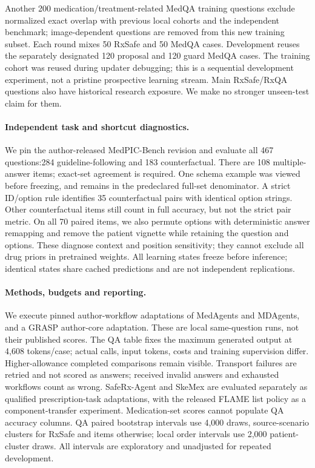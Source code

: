 Another 200 medication/treatment-related MedQA training questions exclude normalized exact overlap with previous local cohorts and the independent benchmark; image-dependent questions are removed from this new training subset. Each round mixes 50 RxSafe and 50 MedQA cases. Development reuses the separately designated 120 proposal and 120 guard MedQA cases. The training cohort was reused during updater debugging; this is a sequential development experiment, not a pristine prospective learning stream. Main RxSafe/RxQA questions also have historical research exposure. We make no stronger unseen-test claim for them.

\paragraph{Independent task and shortcut diagnostics.}
We pin the author-released MedPIC-Bench revision and evaluate all 467 questions:284 guideline-following and 183 counterfactual. There are 108 multiple-answer items; exact-set agreement is required. One schema example was viewed before freezing, and remains in the predeclared full-set denominator. A strict ID/option rule identifies 35 counterfactual pairs with identical option strings. Other counterfactual items still count in full accuracy, but not the strict pair metric. On all 70 paired items, we also permute options with deterministic answer remapping and remove the patient vignette while retaining the question and options. These diagnose context and position sensitivity; they cannot exclude all drug priors in pretrained weights. All learning states freeze before inference; identical states share cached predictions and are not independent replications.

\paragraph{Methods, budgets and reporting.}
We execute pinned author-workflow adaptations of MedAgents and MDAgents, and a GRASP author-core adaptation. These are local same-question runs, not their published scores. The QA table fixes the maximum generated output at 4,608 tokens/case; actual calls, input tokens, costs and training supervision differ. Higher-allowance completed comparisons remain visible. Transport failures are retried and not scored as answers; received invalid answers and exhausted workflows count as wrong. SafeRx-Agent and SkeMex are evaluated separately as qualified prescription-task adaptations, with the released FLAME list policy as a component-transfer experiment. Medication-set scores cannot populate QA accuracy columns. QA paired bootstrap intervals use 4,000 draws, source-scenario clusters for RxSafe and items otherwise; local order intervals use 2,000 patient-cluster draws. All intervals are exploratory and unadjusted for repeated development.

